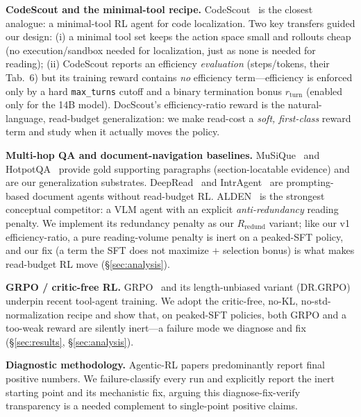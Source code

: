 \documentclass[10pt,twocolumn]{article}
\begin{document}
\textbf{CodeScout and the minimal-tool recipe.} CodeScout~\cite{codescout2026} is the closest analogue: a minimal-tool RL agent for code localization. Two key transfers guided our design: (i) a minimal tool set keeps the action space small and rollouts cheap (no execution/sandbox needed for localization, just as none is needed for reading); (ii) CodeScout reports an efficiency \emph{evaluation} (steps/tokens, their Tab.~6) but its training reward contains \emph{no} efficiency term---efficiency is enforced only by a hard \texttt{max\_turns} cutoff and a binary termination bonus $r_{\text{turn}}$ (enabled only for the 14B model). DocScout's efficiency-ratio reward is the natural-language, read-budget generalization: we make read-cost a \emph{soft, first-class} reward term and study when it actually moves the policy.

\textbf{Multi-hop QA and document-navigation baselines.} MuSiQue~\cite{musique} and HotpotQA~\cite{hotpotqa} provide gold supporting paragraphs (section-locatable evidence) and are our generalization substrates. DeepRead~\cite{deepread} and IntrAgent~\cite{intragent} are prompting-based document agents without read-budget RL. ALDEN~\cite{alden} is the strongest conceptual competitor: a VLM agent with an explicit \emph{anti-redundancy} reading penalty. We implement its redundancy penalty as our $R_{\text{redund}}$ variant; like our v1 efficiency-ratio, a pure reading-volume penalty is inert on a peaked-SFT policy, and our fix (a term the SFT does not maximize $+$ selection bonus) is what makes read-budget RL move (\S\ref{sec:analysis}).

\textbf{GRPO / critic-free RL.} GRPO~\cite{grpo} and its length-unbiased variant (DR.GRPO) underpin recent tool-agent training. We adopt the critic-free, no-KL, no-std-normalization recipe and show that, on peaked-SFT policies, both GRPO and a too-weak reward are silently inert---a failure mode we diagnose and fix (\S\ref{sec:results}, \S\ref{sec:analysis}).

\textbf{Diagnostic methodology.} Agentic-RL papers predominantly report final positive numbers. We failure-classify every run and explicitly report the inert starting point and its mechanistic fix, arguing this diagnose-fix-verify transparency is a needed complement to single-point positive claims.
\end{document}
